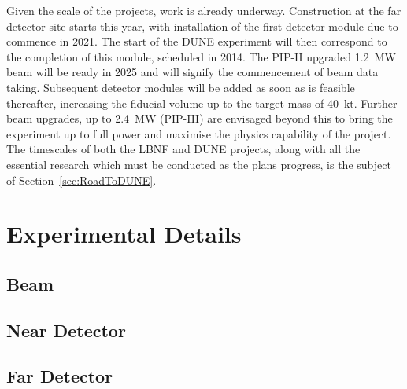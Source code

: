 Given the scale of the projects, work is already underway.  Construction at the far detector site starts this year, with installation of the first detector module due to commence in 2021.  The start of the DUNE experiment will then correspond to the completion of this module, scheduled in 2014.  The PIP-II upgraded 1.2~MW beam will be ready in 2025 and will signify the commencement of beam data taking.  Subsequent detector modules will be added as soon as is feasible thereafter, increasing the fiducial volume up to the target mass of 40~kt.  Further beam upgrades, up to 2.4~MW (PIP-III) are envisaged beyond this to bring the experiment up to full power and maximise the physics capability of the project.  The timescales of both the LBNF and DUNE projects, along with all the essential research which must be conducted as the plans progress, is the subject of Section~\ref{sec:RoadToDUNE}.

\section{Experimental Details}\label{sec:DUNEExperiment}

\subsection{Beam}\label{sec:DUNEBeam}

\subsection{Near Detector}\label{sec:NearDetector}

\subsection{Far Detector}\label{sec:FarDetector}


